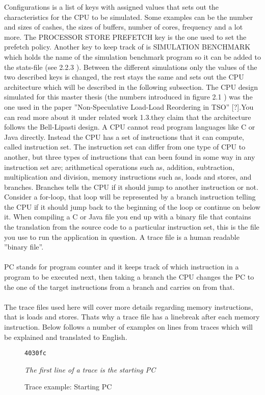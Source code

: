 Configurations is a list of keys with assigned values that sets out the characteristics
for the CPU to be simulated. Some examples can be the number and sizes of
cashes, the sizes of buffers, number of cores, frequency and a lot more. The PROCESSOR
STORE PREFETCH key is the one used to set the prefetch policy. Another
key to keep track of is SIMULATION BENCHMARK which holds the name of the
simulation benchmark program so it can be added to the stats-file (see 2.2.3 \fixme ). Between
the different simulations only the values of the two described keys is changed,
the rest stays the same and sets out the CPU architecture which will be described in
the following subsection.
The CPU design simulated for this master thesis (the numbers introduced in figure
2.1 \fixme ) was the one used in the paper ”Non-Speculative Load-Load Reordering in
TSO” [?].\fixme You can read more about it under related work 1.3.\fixme they claim that the
architecture follows the Bell-Lipasti design.
A CPU cannot read program languages like C or Java directly. Instead the CPU
has a set of instructions that it can compute, called instruction set. The instruction
set can differ from one type of CPU to another, but three types of instructions that
can been found in some way in any instruction set are; arithmetical operations such
as, addition, subtraction, multiplication and division, memory instructions such as,
loads and stores, and branches. Branches tells the CPU if it should jump to another
instruction or not. Consider a for-loop, that loop will be represented by a branch
instruction telling the CPU if it should jump back to the beginning of the loop or
continue on below it. When compiling a C or Java file you end up with a binary file
that contains the translation from the source code to a particular instruction set, this
is the file you use to run the application in question. A trace file is a human readable
”binary file”.
\\\\
PC stands for program counter and it keeps track of which instruction in a program
to be executed next, then taking a branch the CPU changes the PC to the one
of the target instructions from a branch and carries on from that.
\\\\
The trace files used here will cover more details regarding memory instructions,
that is loads and stores. Thats why a trace file has a linebreak after each memory
instruction. Below follows a number of examples on lines from traces which will be
explained and translated to English.
\begin{figure}[h]
\begin{lstlisting}[frame=single]  
4030fc
\end{lstlisting}
\centering
 \emph{The first line of a trace is the starting PC}
  \caption{Trace example: Starting PC}
\end{figure}

